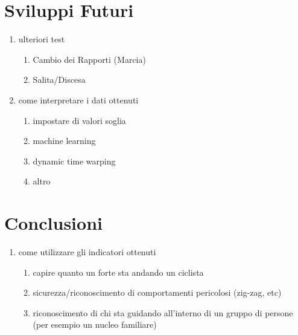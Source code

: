 \documentclass[12pt]{article}
\begin{document}
	\newpage
	\section{Sviluppi Futuri}
	\begin{enumerate}
		\item ulteriori test
		\begin{enumerate}
			\item Cambio dei Rapporti (Marcia)
			\item Salita/Discesa
		\end{enumerate}
		\item come interpretare i dati ottenuti
		\begin{enumerate}
			\item impostare di valori soglia
			\item machine learning
			\item dynamic time warping
			\item altro
		\end{enumerate}
		
	\end{enumerate}
	
	\newpage
	\section{Conclusioni}
	\begin{enumerate}
		\item come utilizzare gli indicatori ottenuti
		\begin{enumerate}
			\item capire quanto un forte sta andando un ciclista
			\item sicurezza/riconoscimento di comportamenti pericolosi (zig-zag, etc)
			\item riconoscimento di chi sta guidando all'interno di un gruppo di persone (per esempio un nucleo familiare)
		\end{enumerate}
	\end{enumerate}
	
\end{document}
